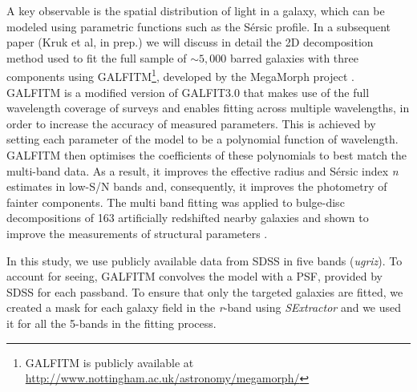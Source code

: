 \documentclass[a4paper,fleqn,usenatbib,useAMS]{mnras}
\begin{document}
A key observable is the spatial distribution of light in a galaxy, which can be modeled using parametric functions such as the S\'ersic profile. In a subsequent paper (Kruk et al, in prep.) we will discuss in detail the 2D decomposition method used to fit the full sample of $\sim$$5,000$ barred galaxies with three components using GALFITM\footnote{GALFITM is publicly available at \url{http://www.nottingham.ac.uk/astronomy/megamorph/}}, developed by the MegaMorph project \citep{Bamford2011,Heussler2013}. GALFITM is a modified version of GALFIT3.0 \citep{Peng2010} that makes use of the full wavelength coverage of surveys and enables fitting across multiple wavelengths, in order to increase the accuracy of measured parameters. This is achieved by setting each parameter of the model to be a polynomial function of wavelength. GALFITM then optimises the coefficients of these polynomials to best match the multi-band data. As a result, it improves the effective radius and  S\'ersic index \textit{n} estimates in low-S/N bands and, consequently, it improves the photometry of fainter components. The multi band fitting was applied to bulge-disc decompositions of 163 artificially redshifted nearby galaxies and shown to improve the measurements of structural parameters \citep{Vika2014}. 

In this study, we use publicly available data from SDSS in five bands (\textit{ugriz}). To account for seeing, GALFITM convolves the model with a PSF, provided by SDSS for each passband. To ensure that only the targeted galaxies are fitted, we created a mask for each galaxy field in the \textit{r}-band using \textit{\uppercase{SE}xtractor} \citep{Sextractor} and we used it for all the 5-bands in the fitting process.
\end{document}
